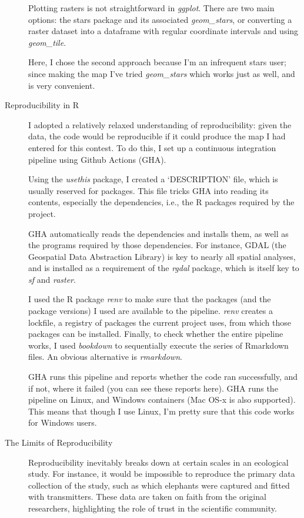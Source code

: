 \begin{description}
	Plotting rasters is not straightforward in \emph{ggplot}. There are two main options: the stars package and its associated \textit{geom\_stars}, or converting a raster dataset into a dataframe with regular coordinate intervals and using \textit{geom\_tile}.
		
	Here, I chose the second approach because I'm an infrequent stars user; since making the map I've tried \textit{geom\_stars} which works just as well, and is very convenient.

	\item[Reproducibility in R] I adopted a relatively relaxed understanding of reproducibility: given the data, the code would be reproducible if it could produce the map I had entered for this contest. To do this, I set up a continuous integration pipeline using Github Actions (GHA).

	Using the \textit{usethis} package, I created a `DESCRIPTION' file, which is usually reserved for packages. This file tricks GHA into reading its contents, especially the dependencies, i.e., the R packages required by the project.

	GHA automatically reads the dependencies and installs them, as well as the programs required by those dependencies. For instance, GDAL (the Geospatial Data Abstraction Library) is key to nearly all spatial analyses, and is installed as a requirement of the \textit{rgdal} package, which is itself key to \textit{sf} and \textit{raster}.

	I used the R package \textit{renv} to make sure that the packages (and the package versions) I used are available to the pipeline. \textit{renv} creates a lockfile, a registry of packages the current project uses, from which those packages can be installed.
	Finally, to check whether the entire pipeline works, I used \textit{bookdown} to sequentially execute the series of Rmarkdown files. An obvious alternative is \textit{rmarkdown}.

	GHA runs this pipeline and reports whether the code ran successfully, and if not, where it failed (you can see these reports here). GHA runs the pipeline on Linux, and Windows containers (Mac OS-x is also supported). This means that though I use Linux, I'm pretty sure that this code works for Windows users.

	\item[The Limits of Reproducibility] Reproducibility inevitably breaks down at certain scales in an ecological study. For instance, it would be impossible to reproduce the primary data collection of the study, such as which elephants were captured and fitted with transmitters. These data are taken on faith from the original researchers, highlighting the role of trust in the scientific community.


\end{description}
